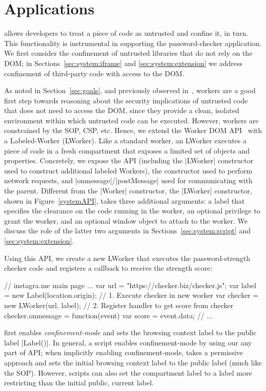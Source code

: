 \section{Applications}
\label{sec:system:worker}

%
%
%
\sys{} allows developers to treat a piece of code as untrusted and
confine it, in turn. This functionality is instrumental in supporting
the password-checker application.
%
We first consider the confinement of untrusted libraries that do not
rely on the DOM; in Sections~\ref{sec:system:iframe} and
\ref{sec:system:extension} we address confinement of third-party code
with access to the DOM.

As noted in Section~\ref{sec:goals}, and previously observed
in~\cite{Ingram:2012}, workers are a good first step towards reasoning
about the security implications of untrusted code that does not need
to access the DOM, since they provide a clean, isolated environment
within which untrusted code can be executed.
%
However, workers are constrained by the SOP, CSP, etc.
%
Hence, we extend the Worker DOM API~\cite{workers} with a
Labeled-Worker (LWorker).
%
Like a standard worker, an LWorker executes a piece of code in a fresh
compartment that exposes a limited set of objects and properties.
%
Concretely, we expose the \sys{} API (including the \js|LWorker|
constructor used to construct additional labeled Workers), the \xhr{}
constructor used to perform network requests, and
\js|onmessage|/\js|postMessage| used for communicating with the
parent.
%
Different from the \js|Worker| constructor, the \js|LWorker|
constructor, shown in Figure~\ref{systemAPI}, takes three additional
arguments: a label that specifies the clearance on the code running in
the worker, an optional privilege to grant the worker, and an optional
window object to attach to the worker.
%
We discuss the role of the latter two arguments in
Sections~\ref{sec:system:script} and \ref{sec:system:extension}.

Using this API, we create a new LWorker that executes the
password-strength checker code and registers a callback to receive the
strength score:
\begin{jscode}
// instagra.me main page ...
var url = "https://checker.biz/checker.js";
var label = new Label(location.origin);
// 1. Execute checker in new worker
var checker = new LWorker(url, label);
// 2. Register handler to get score from checker
checker.onmessage = function(event) {
  var score = event.data; 
  // ...
}
\end{jscode}
%
\sys{} first enables \emph{confinement-mode} and sets the browsing
context label to the public label \js|Label()|.
%
In general, a script enables confinement-mode by using our any part of
API; when implicitly enabling confinement-mode, \sys{} takes a
permissive approach and sets the initial browsing context label to the
public label (much like the SOP).
%
However, scripts can also set the compartment label to a label more
restricting than the initial public, current label.
 
